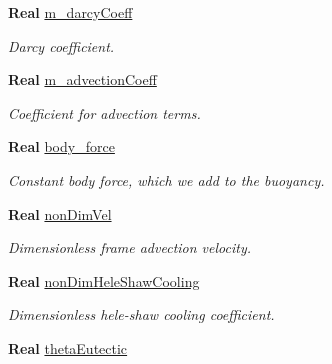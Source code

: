 \begin{DoxyCompactItemize}
\mbox{\label{class_mushy_layer_params_aaebe5958b0fba7ee680fd50ce2cddcc5}} 
\textbf{ Real} \hyperlink{class_mushy_layer_params_aaebe5958b0fba7ee680fd50ce2cddcc5}{m\+\_\+darcy\+Coeff}
\begin{DoxyCompactList}\small\item\em Darcy coefficient. \end{DoxyCompactList}\item 
\mbox{\label{class_mushy_layer_params_ab92ff3374f9423afb3757c46e6ca4ea2}} 
\textbf{ Real} \hyperlink{class_mushy_layer_params_ab92ff3374f9423afb3757c46e6ca4ea2}{m\+\_\+advection\+Coeff}
\begin{DoxyCompactList}\small\item\em Coefficient for advection terms. \end{DoxyCompactList}\item 
\textbf{ Real} \hyperlink{class_mushy_layer_params_afa6da58ee2a066966d6745040c03bc3c}{body\+\_\+force}
\begin{DoxyCompactList}\small\item\em Constant body force, which we add to the buoyancy. \end{DoxyCompactList}\item 
\mbox{\label{class_mushy_layer_params_ad39ae54e74b73aa8ec86df8186b6fa6d}} 
\textbf{ Real} \hyperlink{class_mushy_layer_params_ad39ae54e74b73aa8ec86df8186b6fa6d}{non\+Dim\+Vel}
\begin{DoxyCompactList}\small\item\em Dimensionless frame advection velocity. \end{DoxyCompactList}\item 
\mbox{\label{class_mushy_layer_params_aa62c3b14e58be4912cacb2120068960a}} 
\textbf{ Real} \hyperlink{class_mushy_layer_params_aa62c3b14e58be4912cacb2120068960a}{non\+Dim\+Hele\+Shaw\+Cooling}
\begin{DoxyCompactList}\small\item\em Dimensionless hele-\/shaw cooling coefficient. \end{DoxyCompactList}\item 
\mbox{\label{class_mushy_layer_params_a45829b6d494fc913f1680e2352596c38}} 
\textbf{ Real} \hyperlink{class_mushy_layer_params_a45829b6d494fc913f1680e2352596c38}{theta\+Eutectic}

\end{DoxyCompactItemize}
